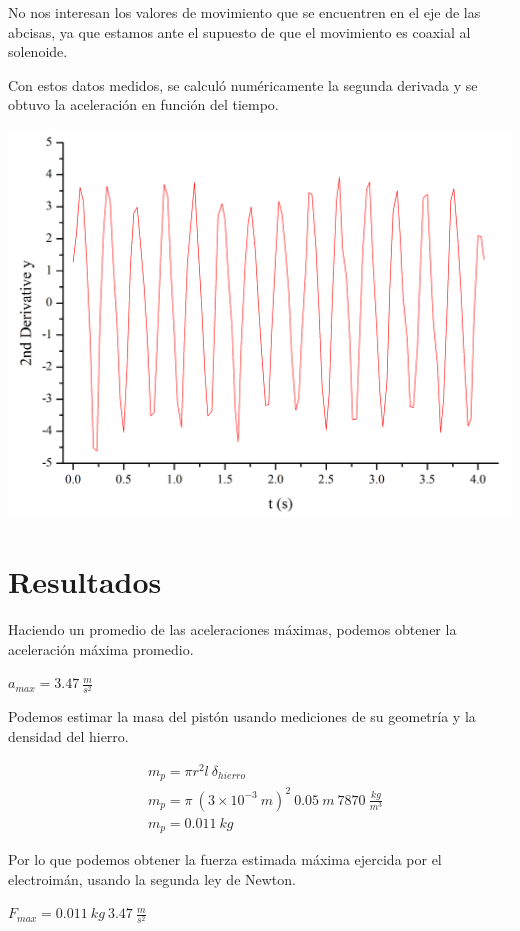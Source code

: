 \documentclass[a4paper,12pt]{article}
\newenvironment{Figure}
    {\par\medskip\noindent\minipage{\linewidth}}
    {\endminipage\par\medskip}
\begin{document}
        No nos interesan los valores de movimiento que se encuentren en el eje de las abcisas, ya que estamos ante el supuesto de que el movimiento es coaxial al solenoide.

        Con estos datos medidos, se calculó numéricamente la segunda derivada y se obtuvo la aceleración en función del tiempo.

        \begin{Figure}
            \centering
            \includegraphics[width=0.55\linewidth]{mediciones_aceleracion.png}
            \label{fig: mediciones_aceleracion}
        \end{Figure}

\section*{Resultados}

        Haciendo un promedio de las aceleraciones máximas, podemos obtener la aceleración máxima promedio.

        $a_{max} = 3.47 \ \frac{m}{s^2}$

        Podemos estimar la masa del pistón usando mediciones de su geometría y la densidad del hierro.

        \begin{align*}
            &m_p = \pi r^2 l \ \delta_{hierro} \\
            &m_p = \pi \ (3 \times 10^{-3} \ m)^2 \ 0.05 \ m \ 7870 \ \frac{kg}{m^3} \\
            &m_p = 0.011 \ kg
        \end{align*}

        Por lo que podemos obtener la fuerza estimada máxima ejercida por el electroimán, usando la segunda ley de Newton.

        $F_{max} = 0.011 \ kg \ 3.47 \ \frac{m}{s^2} $
\end{document}
